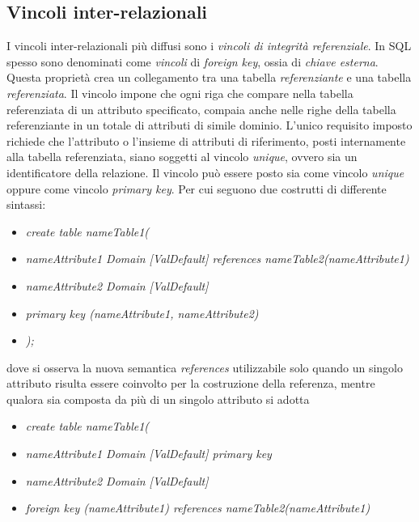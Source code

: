 \documentclass{article}
\begin{document}
\subsection*{Vincoli inter-relazionali}
I vincoli inter-relazionali più diffusi sono i \textit{vincoli di integrità referenziale}. In SQL spesso sono denominati come \textit{vincoli} di \textit{foreign key}, ossia di \textit{chiave esterna}. Questa proprietà crea un collegamento tra una tabella \textit{referenziante} e una tabella \textit{referenziata}. Il vincolo impone che ogni riga che compare nella tabella referenziata di un attributo specificato, compaia anche nelle righe della tabella referenziante in un totale di attributi di simile dominio. L'unico requisito imposto richiede che l'attributo o l'insieme di attributi di riferimento, posti internamente alla tabella referenziata, siano soggetti al vincolo \textit{unique}, ovvero sia un identificatore della relazione. Il vincolo può essere posto sia come vincolo \textit{unique} oppure come vincolo \textit{primary key}. Per cui seguono due costrutti di differente sintassi:
\begin{itemize}[label={ }, leftmargin=1cm]
    \item \textit{create table nameTable1(}
\end{itemize}
\begin{itemize}[label={ }, leftmargin=2cm]
    \itemsep0em
    \item \textit{nameAttribute1 Domain [ValDefault] references nameTable2(nameAttribute1)}
    \item \textit{nameAttribute2 Domain [ValDefault]}
    \item \textit{primary key (nameAttribute1, nameAttribute2)}
\end{itemize}
\begin{itemize}[label={ }, leftmargin=1cm]
    \item \textit{);}
\end{itemize}
dove si osserva la nuova semantica \textit{references} utilizzabile solo quando un singolo attributo risulta essere coinvolto per la costruzione della referenza, mentre qualora sia composta da più di un singolo attributo si adotta
\begin{itemize}[label={ }, leftmargin=1cm]
    \item \textit{create table nameTable1(}
\end{itemize}
\begin{itemize}[label={ }, leftmargin=2cm]
    \itemsep0em
    \item \textit{nameAttribute1 Domain [ValDefault] primary key}
    \item \textit{nameAttribute2 Domain [ValDefault]}
    \item \textit{foreign key (nameAttribute1) references nameTable2(nameAttribute1)}
\end{itemize}
\end{document}
